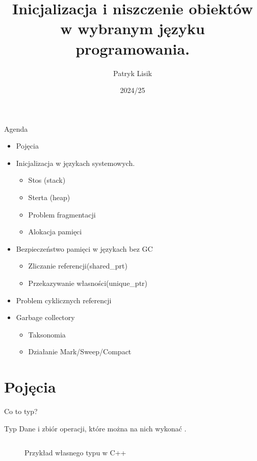\documentclass{beamer}
\title[Cykl życia obiektów]{Inicjalizacja i niszczenie obiektów w wybranym języku programowania.} %
\author{Patryk Lisik} %
\institute[] %
{
 Uniwersytet Łódzki \\ %
}
\date{2024/25} %
\begin{document}
\begin{frame}
\titlepage
\end{frame}

\begin{frame}{Agenda}
    \begin{itemize}
        \item Pojęcia
        \item  Inicjalizacja w językach systemowych. 
            \begin{itemize}
                \item Stos (stack)
                \item Sterta (heap)
                \item Problem fragmentacji
                \item Alokacja pamięci
            \end{itemize}
        \item Bezpieczeństwo pamięci w językach bez GC
            \begin{itemize}
                \item Zliczanie referencji(shared\_prt)
                \item Przekazywanie własności(unique\_ptr)
            \end{itemize}
        \item Problem cyklicznych referencji
        \item Garbage collectory 
            \begin{itemize}
                    \item Taksonomia
                    \item Działanie Mark/Sweep/Compact
            \end{itemize}
    \end{itemize}
\end{frame}

\section{Pojęcia}

\begin{frame}[containsverbatim]{Co to typ?}
    \begin{block}{Typ}
        Dane i zbiór operacji, które można na nich wykonać \cite{IBM-What-is-type}.
    \end{block}
    \begin{figure}
        \centering
        \inputminted{cpp}{LineFunc.cpp}
    \caption{Przykład własnego typu w C++}
        \label{fig:cpp-operator-oveerload}
    \end{figure}

\end{frame}
\end{document}
